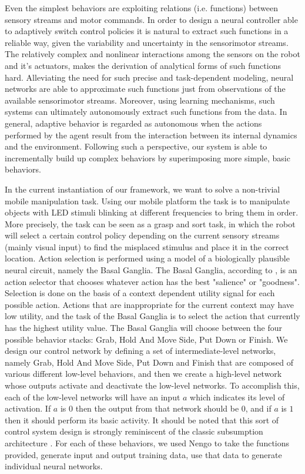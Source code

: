 Even the simplest behaviors are exploiting relations (i.e. functions) between sensory streams and motor commands. 
In order to design a neural controller able to adaptively switch control policies it is natural to extract such functions in a reliable way, given the variability and uncertainty in the sensorimotor streams. 
The relatively complex and nonlinear interactions among the sensors on the robot and it’s actuators, makes the derivation of analytical forms of such functions hard. 
Alleviating the need for such precise and task-dependent modeling, neural networks are able to approximate such functions just from observations of the available sensorimotor streams. 
Moreover, using learning mechanisms, such systems can ultimately autonomously extract such functions from the data. 
In general, adaptive behavior is regarded as autonomous when the actions performed by the agent result from the interaction between its internal dynamics and the environment. 
Following such a perspective, our system is able to incrementally build up complex behaviors by superimposing more simple, basic behaviors.

In the current instantiation of our framework, we want to solve a non-trivial mobile manipulation task. 
Using our mobile platform the task is to manipulate objects with LED stimuli blinking at different frequencies to bring them in order. 
More precisely, the task can be seen as a grasp and sort task, in which the robot will select a certain control policy depending on the current sensory streams (mainly visual input) to find the misplaced stimulus and place it in the correct location. 
Action selection is performed using a model of a biologically plausible neural circuit, namely the Basal Ganglia. 
The Basal Ganglia, according to \cite{Stewart2010}, is an action selector that chooses whatever action has the best "salience" or "goodness". 
Selection is done on the basis of a context dependent utility signal for each possible action. 
Actions that are inappropriate for the current context may have low utility, and the task of the Basal Ganglia is to select the action that currently has the highest utility value.
The Basal Ganglia will choose between the four possible behavior stacks: Grab, Hold And Move Side, Put Down or Finish.
We design our control network by defining a set of intermediate-level networks, namely Grab, Hold And Move Side, Put Down and Finish that are composed of various different low-level behaviors, and then we create a high-level network whose outputs activate and deactivate the low-level networks. 
To accomplish this, each of the low-level networks will have an input $a$ which indicates its level of activation. 
If $a$ is $0$ then the output from that network should be $0$, and if $a$ is $1$ then it should perform its basic activity. 
It should be noted that this sort of control system design is strongly reminiscent of the classic subsumption architecture \cite{Brooks1986}.
For each of these behaviors, we used \ac{Nengo} to take the functions provided, generate input and output training data, use that data to generate individual neural networks.

